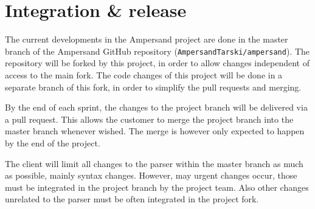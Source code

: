 
\section{Integration \& release}
\label{sec:integration-release}
%
%
%
%
The current developments in the Ampersand project are done in the master branch of the Ampersand GitHub repository (\texttt{AmpersandTarski/ampersand}).
The repository will be forked by this project, in order to allow changes independent of access to the main fork.
The code changes of this project will be done in a separate branch of this fork, in order to simplify the pull requests and merging.

By the end of each sprint, the changes to the project branch will be delivered via a pull request.
This allows the customer to merge the project branch into the master branch whenever wished.
The merge is however only expected to happen by the end of the project.

The client will limit all changes to the parser within the master branch as much as possible, mainly syntax changes.
However, may urgent changes occur, those must be integrated in the project branch by the project team.
Also other changes unrelated to the parser must be often integrated in the project fork.
